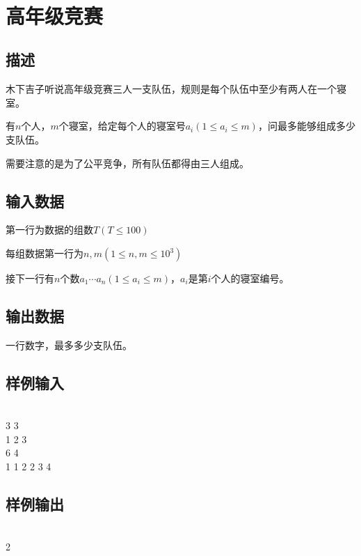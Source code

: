 \documentclass[UTF8]{ctexrep}
\begin{document}
\tt
{}
\fi


\section{高年级竞赛}
\subsection*{描述}
木下吉子听说高年级竞赛三人一支队伍，规则是每个队伍中至少有两人在一个寝室。

有$n$个人，$m$个寝室，给定每个人的寝室号$a_i(1\leqslant a_i \leqslant m)$，问最多能够组成多少支队伍。

需要注意的是为了公平竞争，所有队伍都得由三人组成。

\subsection*{输入数据}
第一行为数据的组数$T(T\leqslant 100)$

每组数据第一行为$n,m(1\leqslant n,m\leqslant 10^3)$

接下一行有$n$个数$a_1\cdots a_n(1\leqslant a_i\leqslant m)$，$a_i$是第$i$个人的寝室编号。

\subsection*{输出数据}
一行数字，最多多少支队伍。

\subsection*{样例输入}
\\
3 3\\
1 2 3\\
6 4\\
1 1 2 2 3 4

\subsection*{样例输出}
\\
2


\ifx\allfiles\undefined
\end{document}
